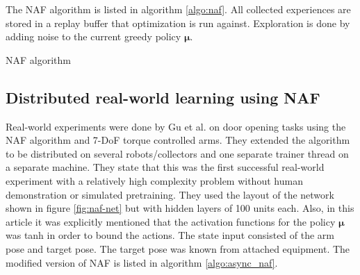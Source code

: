 The NAF algorithm is listed in algorithm \ref{algo:naf}. All collected experiences
are stored in a replay buffer that optimization is run against. Exploration is done
by adding noise to the current greedy policy $\mathbf{\mu}$.

\begin{algorithm}[!h]
    \caption{NAF algorithm}
    \begin{algorithmic}
                \ENDFOR
            \ENDFOR
        \ENDFOR
    \end{algorithmic}
    \label{algo:naf}
\end{algorithm}

\subsection{Distributed real-world learning using NAF}
\label{sec:distributed_naf}

Real-world experiments were done by Gu et al. \cite{gu2016deep} on door opening
tasks using the NAF algorithm and 7-DoF torque controlled arms. They extended
the algorithm to be distributed on several robots/collectors and one separate
trainer thread on a separate machine. They state that this was the first
successful real-world experiment with a relatively high complexity problem
without human demonstration or simulated pretraining. They used the layout of
the network shown in figure \ref{fig:naf-net} but with hidden layers of 100
units each. Also, in this article it was explicitly mentioned that the
activation functions for the policy $\mathbf{\mu}$ was tanh in order to bound
the actions. The state input consisted of the arm pose and target pose. The
target pose was known from attached equipment. The modified version of NAF is
listed in algorithm \ref{algo:async_naf}.

